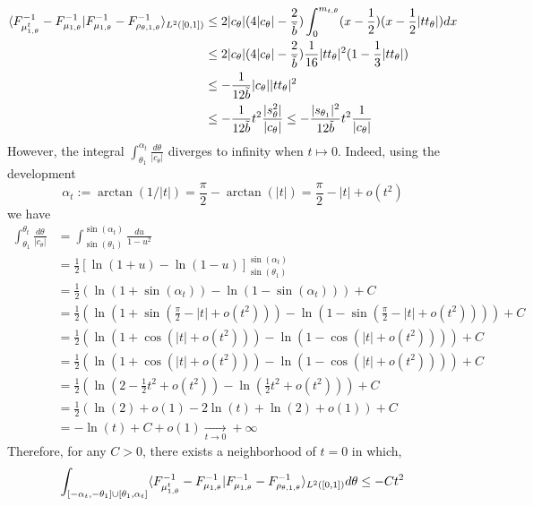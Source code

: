 \begin{itemize}
        \begin{align} 
            \langle F^{-1}_{\mu^t_{1,\theta}} - F^{-1}_{\mu_{1,\theta}}|F^{-1}_{\mu_{1,\theta}} - F^{-1}_{\rho_{\theta,1,\theta}}\rangle_{L^2([0,1])} 
            &\leq 2|c_\theta|(4|c_\theta|-\frac{2}{\tilde{b}}) \int_0^{m_{t,\theta}} (x - \frac{1}{2})(x - \frac{1}{2}|tt_\theta|) dx \\
            &\leq 2|c_\theta|(4|c_\theta|-\frac{2}{\tilde{b}}) \frac{1}{16}|tt_\theta|^2(1 - \frac{1}{3}|tt_\theta|) \\
            &\leq -\frac{1}{12\tilde{b}} |c_\theta| |tt_\theta|^2 \\
            &\leq -\frac{1}{12\tilde{b}} t^2 \frac{|s_\theta^2|}{|c_\theta|} \leq -\frac{|s_{\theta_1}|^2}{12\tilde{b}} t^2 \frac{1}{|c_\theta|}
        \end{align}
        However, the integral $\int_{\theta_1}^{\alpha_t} \frac{d\theta}{|c_\theta|}$ diverges to infinity when $t \mapsto 0$. Indeed, using the development 
        \begin{equation} \alpha_t := \arctan(1/|t|) = \frac{\pi}{2} - \arctan(|t|) = \frac{\pi}{2} - |t| + o(t^2) \end{equation}
        we have
        \begin{align} 
           \int_{\theta_1}^{\theta_t} \frac{d\theta}{|c_\theta|} &= \int_{\sin(\theta_1)}^{\sin(\alpha_t)} \frac{du}{1 - u^2} \\
           &= \frac{1}{2} [ \ln(1+u) - \ln(1-u) ]^{\sin(\alpha_t)}_{\sin(\theta_1)} \\
           &= \frac{1}{2} (\ln(1+\sin(\alpha_t)) - \ln(1-\sin(\alpha_t))) + C \\
           &= \frac{1}{2} \left(\ln\left(1+\sin\left(\frac{\pi}{2} - |t| + o(t^2)\right)\right) - \ln\left(1-\sin\left(\frac{\pi}{2} - |t| + o(t^2)\right)\right)\right) + C \\
           &= \frac{1}{2} (\ln(1+\cos(|t| + o(t^2))) - \ln(1-\cos(|t| + o(t^2)))) + C \\
           &= \frac{1}{2} (\ln(1+\cos(|t| + o(t^2))) - \ln(1-\cos(|t| + o(t^2)))) + C \\
           &= \frac{1}{2}\left(\ln\left(2 - \frac{1}{2}t^2 + o(t^2)\right) - \ln\left(\frac{1}{2}t^2 + o(t^2)\right)\right) + C\\
           &= \frac{1}{2}(\ln(2) + o(1) - 2\ln(t) + \ln(2) + o(1)) + C \\
           &= -\ln(t) + C + o(1) \xrightarrow[t \to 0]{} +\infty
        \end{align}
        Therefore, for any $C > 0$, there exists a neighborhood of $t = 0$ in which,
        \begin{equation}
             \label{eq:proof_l328} \int_{[-\alpha_t,-\theta_1]\cup[\theta_1,\alpha_t]} \langle F^{-1}_{\mu^t_{1,\theta}} - F^{-1}_{\mu_{1,\theta}}|F^{-1}_{\mu_{1,\theta}} - F^{-1}_{\rho_{\theta,1,\theta}}\rangle_{L^2([0,1])} d\theta 
            \leq -Ct^2 
        \end{equation}
    \end{itemize}
